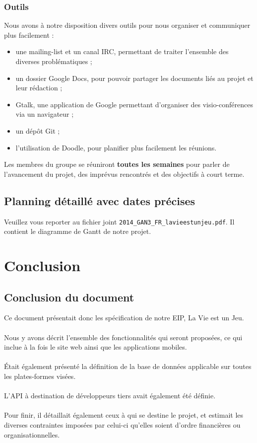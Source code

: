 \documentclass{life-fr}
\begin{document}
\subsection{ Outils}

Nous avons à notre disposition divers outils pour nous organiser et communiquer plus facilement :\\

\begin{itemize}
  \item une mailing-list et un canal IRC, permettant de traiter l'ensemble des diverses problématiques ;
  \item un dossier Google Docs, pour pouvoir partager les documents liés au projet et leur rédaction ;
  \item Gtalk, une application de Google permettant d'organiser des visio-conférences via un navigateur ;
  \item un dépôt Git ;
  \item l'utilisation de Doodle, pour planifier plus facilement les réunions.
\end{itemize}

Les membres du groupe se réuniront \textbf{toutes les semaines} pour parler de l'avancement du projet, des imprévus rencontrés et des objectifs à court terme.


\section{Planning détaillé avec dates précises}

Veuillez vous reporter au fichier joint \texttt{2014\_GAN3\_FR\_lavieestunjeu.pdf}. Il contient le diagramme de Gantt de notre projet.


\chapter{Conclusion}

\section{Conclusion du document}

Ce document présentait donc les spécification de notre EIP, La Vie est un Jeu.\\
\\
Nous y avons décrit l'ensemble des fonctionnalités qui seront proposées, ce qui inclue à la fois le site web ainsi que les applications mobiles.\\
\\
Était également présenté la définition de la base de données applicable sur toutes les plates-formes visées.\\
\\
L’API à destination de développeurs tiers avait également été définie.\\
\\
Pour finir, il détaillait également ceux à qui se destine le projet, et estimait les diverses contraintes imposées par celui-ci qu’elles soient d’ordre financières ou organisationnelles.\\
\end{document}
